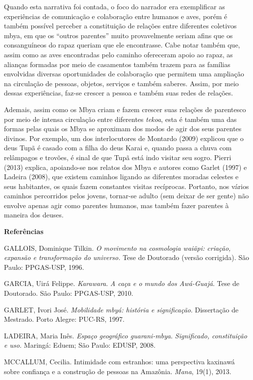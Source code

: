 Quando esta narrativa foi contada, o foco do narrador era exemplificar
as experiências de comunicação e colaboração entre humanos e aves, porém
é também possível perceber a constituição de relações entre diferentes
coletivos mbya, em que os ``outros parentes'' muito provavelmente seriam
afins que os consanguíneos do rapaz queriam que ele encontrasse. Cabe
notar também que, assim como as aves encontradas pelo caminho ofereceram
apoio ao rapaz, as alianças formadas por meio de casamentos também
trazem para as famílias envolvidas diversas oportunidades de colaboração
que permitem uma ampliação na circulação de pessoas, objetos, serviços e
também saberes. Assim, por meio dessas experiências, faz-se crescer a
pessoa e também suas redes de relações.

Ademais, assim como os Mbya criam e fazem crescer suas relações de
parentesco por meio de intensa circulação entre diferentes \emph{tekoa},
esta é também uma das formas pelas quais os Mbya se aproximam dos modos
de agir dos seus parentes divinos. Por exemplo, um dos interlocutores de
Montardo (2009) explicou que o deus Tupã é casado com a filha do deus
Karai e, quando passa a chuva com relâmpagos e trovões, é sinal de que
Tupã está indo visitar seu sogro. Pierri (2013) explica, apoiando-se nos
relatos dos Mbya e autores como Garlet (1997) e Ladeira (2008), que
existem caminhos ligando as diferentes moradas celestes e seus
habitantes, os quais fazem constantes visitas recíprocas. Portanto, nos
vários caminhos percorridos pelos jovens, tornar-se adulto (sem deixar
de ser gente) não envolve apenas agir como parentes humanos, mas também
fazer parentes à maneira dos deuses.

\textbf{Referências}

GALLOIS, Dominique Tilkin. \emph{O movimento na cosmologia waiãpi:
criação, expansão e transformação do universo.} Tese de Doutorado
(versão corrigida). São Paulo: PPGAS-USP, 1996.

GARCIA, Uirá Felippe. \emph{Karawara}. \emph{A caça e o mundo dos
Awá-Guajá}. Tese de Doutorado. São Paulo: PPGAS-USP, 2010.

GARLET, Ivori José. \emph{Mobilidade mbyá: história e significação}.
Dissertação de Mestrado. Porto Alegre: PUC-RS, 1997.

LADEIRA, Maria Inês. \emph{Espaço geográfico guarani-mbya}.
\emph{Significado, constituição e uso.} Maringá: Eduem; São Paulo:
EDUSP, 2008.

MCCALLUM, Cecilia. Intimidade com estranhos: uma perspectiva kaxinawá
sobre confiança e a construção de pessoas na Amazônia. \emph{Mana},
19(1), 2013.

